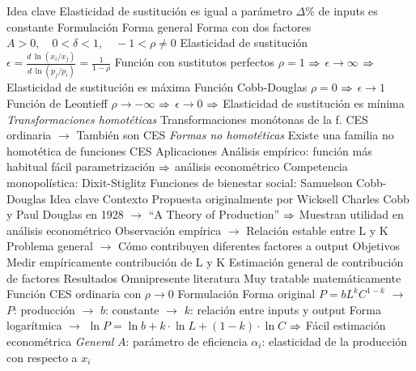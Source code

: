 \documentclass{nuevotema}
\begin{document}
\begin{esquemal}
			\3 Idea clave
				\4 Elasticidad de sustitución es igual a parámetro
				\4[$\to$] $\varDelta \%$ de inputs es constante
			\3 Formulación
				\4 Forma general
				\4[] 
				\4 Forma con dos factores
				\4[] 
				\4[] $A>0 , \quad 0 < \delta < 1 , \quad -1 < \rho \neq 0$
				\4 Elasticidad de sustitución
				\4[] $\epsilon = \frac{d \, \ln \left( x_i / x_j \right)}{d \, \ln \left( p_j/p_i\right)} =\frac{1}{1-\rho}$
				\4 Función con sustitutos perfectos
				\4[] $\rho = 1$ $\Rightarrow$ $\epsilon \to \infty$
				\4[] $\Rightarrow$ Elasticidad de sustitución es máxima
				\4 Función Cobb-Douglas
				\4[] $\rho = 0$ $\Rightarrow$ $\epsilon \to 1$
				\4 Función de Leontieff
				\4[] $\rho \to -\infty$ $\Rightarrow$ $\epsilon \to 0$
				\4[] $\Rightarrow$ Elasticidad de sustitución es mínima
				\4 \textit{Transformaciones homotéticas}
				\4[] Transformaciones monótonas de la f. CES ordinaria
				\4[] $\to$ También son CES
				\4 \textit{Formas no homotéticas}
				\4 Existe una familia no homotética de funciones CES
			\3 Aplicaciones
				\4 Análisis empírico: función más habitual
				\4[$\to$] fácil parametrización $\Rightarrow$ análisis econométrico
				\4 Competencia monopolística: Dixit-Stiglitz
				\4 Funciones de bienestar social: Samuelson
		\2 Cobb-Douglas
			\3 Idea clave
				\4 Contexto
				\4[] Propuesta originalmente por Wicksell
				\4[] Charles Cobb y Paul Douglas en 1928
				\4[] $\to$ ``A Theory of Production''
				\4[] $\Rightarrow$ Muestran utilidad en análisis econométrico
				\4[] Observación empírica
				\4[] $\to$ Relación estable entre L y K
				\4[] Problema general
				\4[] $\to$ Cómo contribuyen diferentes factores a output
				\4 Objetivos
				\4[] Medir empíricamente contribución de L y K
				\4[] Estimación general de contribución de factores
				\4 Resultados
				\4[] Omnipresente literatura
				\4[] Muy tratable matemáticamente
				\4[] Función CES ordinaria con $\rho \to 0$
			\3 Formulación
				\4 Forma original
				\4[] $P = b L^k C^{1-k}$
				\4[] $\to$ $P$: producción
				\4[] $\to$ $b$: constante
				\4[] $\to$ $k$: relación entre inputs y output
				\4[] Forma logarítmica
				\4[] $\to$ $\ln P = \ln b + k \cdot \ln L + (1-k) \cdot \ln C$
				\4[] $\Rightarrow$ Fácil estimación econométrica
				\4 \textit{General}
				\4[] 
				\4[] $A$: parámetro de eficiencia
				\4[] $\alpha_i$: elasticidad de la producción con respecto a $x_i$

\end{esquemal}
\end{document}
